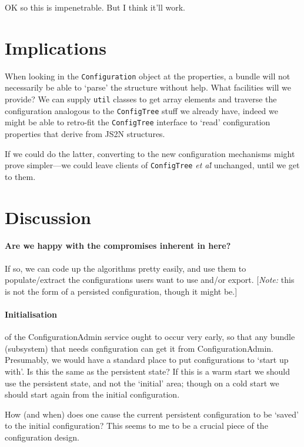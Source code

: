 \documentclass[a4paper,twoside,12pt]{article}
\begin{document}
OK so this is impenetrable. But I think it'll work.

\section{Implications}
When looking in the \texttt{Configuration} object at the properties, a bundle will not necessarily be able to `parse' the structure without help. What facilities will we provide? We can supply \texttt{util} classes to get array elements and traverse the configuration analogous to the \texttt{ConfigTree} stuff we already have, indeed we might be able to retro-fit the \texttt{ConfigTree} interface to `read' configuration properties that derive from JS2N structures.

If we could do the latter, converting to the new configuration mechanisms might prove simpler---we could leave clients of \texttt{ConfigTree} \emph{et al\.} unchanged, until we get to them.

\section{Discussion}

\paragraph{Are we happy with the compromises inherent in here?} If so, we can code up the algorithms pretty easily, and use them to populate/extract the configurations users want to use and/or export. [\emph{Note:} this is not the form of a persisted configuration, though it might be.]

\paragraph{Initialisation} of the ConfigurationAdmin service ought to occur very early, so that any bundle (subsystem) that needs configuration can get it from ConfigurationAdmin. Presumably, we would have a standard place to put configurations to `start up with'. Is this the same as the persistent state? If this is a warm start we should use the persistent state, and not the `initial' area; though on a cold start we should start again from the initial configuration.

How (and when) does one cause the current persistent configuration to be `saved' to the initial configuration? This seems to me to be a crucial piece of the configuration design.

 
\end{document}
